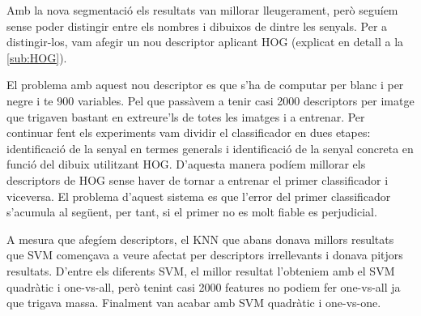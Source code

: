 Amb la nova segmentació els resultats van millorar lleugerament, però seguíem sense poder distingir entre els nombres
i dibuixos de dintre les senyals. Per a distingir-los, vam afegir un nou descriptor aplicant HOG 
(explicat en detall a la \cref{sub:HOG}).

El problema amb aquest nou descriptor es que s'ha de computar per blanc i per negre i te 900 variables. Pel que passàvem
a tenir casi 2000 descriptors per imatge que trigaven bastant en extreure'ls de totes les imatges i a entrenar. Per
continuar fent els experiments vam dividir el classificador en dues etapes: identificació de la senyal en termes generals
i identificació de la senyal concreta en funció del dibuix utilitzant HOG. D'aquesta manera podíem millorar els descriptors
de HOG sense haver de tornar a entrenar el primer classificador i viceversa. El problema d'aquest sistema es que l'error
del primer classificador s'acumula al següent, per tant, si el primer no es molt fiable es perjudicial.

A mesura que afegíem descriptors, el KNN que abans donava millors resultats que SVM començava a veure afectat per
descriptors irrellevants i donava pitjors resultats. D'entre els diferents SVM, el millor resultat l'obteniem amb
el SVM quadràtic i one-vs-all, però tenint casi 2000 features no podiem fer one-vs-all ja que trigava massa.
Finalment van acabar amb SVM quadràtic i one-vs-one.
